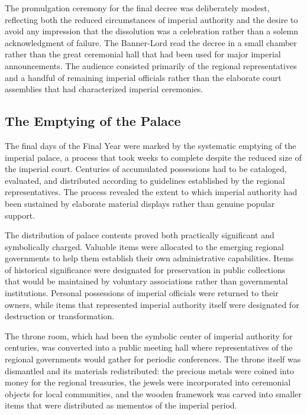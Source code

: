 The promulgation ceremony for the final decree was deliberately modest,
reflecting both the reduced circumstances of imperial authority and the
desire to avoid any impression that the dissolution was a celebration
rather than a solemn acknowledgment of failure. The Banner-Lord read the
decree in a small chamber rather than the great ceremonial hall that had
been used for major imperial announcements. The audience consisted
primarily of the regional representatives and a handful of remaining
imperial officials rather than the elaborate court assemblies that had
characterized imperial ceremonies.

\subsection{The Emptying of the
Palace}\label{the-emptying-of-the-palace}

The final days of the Final Year were marked by the systematic emptying
of the imperial palace, a process that took weeks to complete despite
the reduced size of the imperial court. Centuries of accumulated
possessions had to be cataloged, evaluated, and distributed according to
guidelines established by the regional representatives. The process
revealed the extent to which imperial authority had been sustained by
elaborate material displays rather than genuine popular support.

The distribution of palace contents proved both practically significant
and symbolically charged. Valuable items were allocated to the emerging
regional governments to help them establish their own administrative
capabilities. Items of historical significance were designated for
preservation in public collections that would be maintained by voluntary
associations rather than governmental institutions. Personal possessions
of imperial officials were returned to their owners, while items that
represented imperial authority itself were designated for destruction or
transformation.

The throne room, which had been the symbolic center of imperial
authority for centuries, was converted into a public meeting hall where
representatives of the regional governments would gather for periodic
conferences. The throne itself was dismantled and its materials
redistributed: the precious metals were coined into money for the
regional treasuries, the jewels were incorporated into ceremonial
objects for local communities, and the wooden framework was carved into
smaller items that were distributed as mementos of the imperial period.

